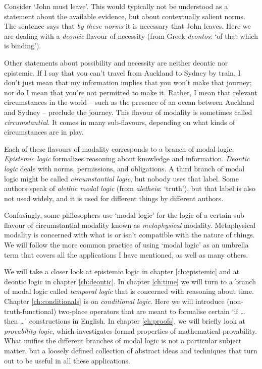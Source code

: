 Consider `John must leave'. This would typically not be understood as a
statement about the available evidence, but about contextually salient norms.
The sentence says that \emph{by these norms} it is necessary that John leaves.
Here we are dealing with a \emph{deontic} flavour of necessity (from Greek
\emph{deontos}: `of that which is binding').

Other statements about possibility and necessity are neither deontic nor
epistemic. If I say that you can't travel from Auckland to Sydney by train, I
don't just mean that my information implies that you won't make that journey;
nor do I mean that you're not permitted to make it. Rather, I mean that relevant
circumstances in the world -- such as the presence of an ocean between Auckland
and Sydney -- preclude the journey. This flavour of modality is sometimes called
\emph{circumstantial}. It comes in many sub-flavours, depending on what kinds of
circumstances are in play.


Each of these flavours of modality corresponds to a branch of modal logic.
\emph{Epistemic logic} formalizes reasoning about knowledge and information.
\emph{Deontic logic} deals with norms, permissions, and obligations. A third
branch of modal logic might be called \emph{circumstantial logic}, but nobody
uses that label. Some authors speak of \emph{alethic modal logic} (from
\emph{aletheia}: `truth'), but that label is also not used widely, and it is
used for different things by different authors.


Confusingly, some philosophers use `modal logic' for the logic of a certain
sub-flavour of circumstantial modality known as \emph{metaphysical} modality.
Metaphysical modality is concerned with what is or isn't compatible with the
nature of things. We will follow the more common practice of using `modal logic'
as an umbrella term that covers all the applications I have mentioned, as well
as many others.

We will take a closer look at epistemic logic in chapter
\ref{ch:epistemic} and at deontic logic in chapter \ref{ch:deontic}. In chapter
\ref{ch:time} we will turn to a branch of modal logic called \emph{temporal
  logic} that is concerned with reasoning about time. Chapter
\ref{ch:conditionals} is on \emph{conditional logic}. Here we will introduce
(non-truth-functional) two-place operators that are meant to formalise certain
`if \ldots then \ldots' constructions in English. In chapter \ref{ch:proofs}, we
will briefly look at \emph{provability logic}, which investigates formal
properties of mathematical provability. What unifies the different branches of
modal logic is not a particular subject matter, but a loosely defined collection
of abstract ideas and techniques that turn out to be useful in all these
applications.

